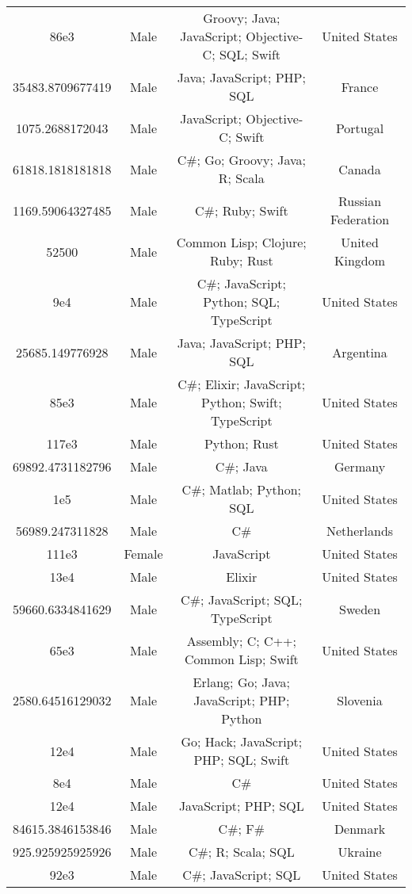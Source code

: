 \begin{center}
\begin{tabular}{ |c|c|c|c| }
86e3  &  Male  &  Groovy; Java; JavaScript; Objective-C; SQL; Swift  &  United States  \\ 
35483.8709677419  &  Male  &  Java; JavaScript; PHP; SQL  &  France  \\ 
1075.2688172043  &  Male  &  JavaScript; Objective-C; Swift  &  Portugal  \\ 
61818.1818181818  &  Male  &  C\#; Go; Groovy; Java; R; Scala  &  Canada  \\ 
1169.59064327485  &  Male  &  C\#; Ruby; Swift  &  Russian Federation  \\ 
52500  &  Male  &  Common Lisp; Clojure; Ruby; Rust  &  United Kingdom  \\ 
9e4  &  Male  &  C\#; JavaScript; Python; SQL; TypeScript  &  United States  \\ 
25685.149776928  &  Male  &  Java; JavaScript; PHP; SQL  &  Argentina  \\ 
85e3  &  Male  &  C\#; Elixir; JavaScript; Python; Swift; TypeScript  &  United States  \\ 
117e3  &  Male  &  Python; Rust  &  United States  \\ 
69892.4731182796  &  Male  &  C\#; Java  &  Germany  \\ 
1e5  &  Male  &  C\#; Matlab; Python; SQL  &  United States  \\ 
56989.247311828  &  Male  &  C\#  &  Netherlands  \\ 
111e3  &  Female  &  JavaScript  &  United States  \\ 
13e4  &  Male  &  Elixir  &  United States  \\ 
59660.6334841629  &  Male  &  C\#; JavaScript; SQL; TypeScript  &  Sweden  \\ 
65e3  &  Male  &  Assembly; C; C++; Common Lisp; Swift  &  United States  \\ 
2580.64516129032  &  Male  &  Erlang; Go; Java; JavaScript; PHP; Python  &  Slovenia  \\ 
12e4  &  Male  &  Go; Hack; JavaScript; PHP; SQL; Swift  &  United States  \\ 
8e4  &  Male  &  C\#  &  United States  \\ 
12e4  &  Male  &  JavaScript; PHP; SQL  &  United States  \\ 
84615.3846153846  &  Male  &  C\#; F\#  &  Denmark  \\ 
925.925925925926  &  Male  &  C\#; R; Scala; SQL  &  Ukraine  \\ 
92e3  &  Male  &  C\#; JavaScript; SQL  &  United States  \\ 

\end{tabular}
\end{center}
